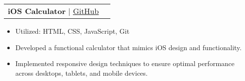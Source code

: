 \documentclass[letterpaper,11pt]{article}
\makeatletter
\newcommand{\resumeItem}[1]{
  \item\small{
    {#1 \vspace{-3pt}}
  }
}
\newcommand{\resumeProjectHeading}[2]{
    \item
    \begin{tabular*}{0.97\textwidth}{l@{\extracolsep{\fill}}r@{\hspace{-0.2in}}}
        \small#1 & #2 \\
    \end{tabular*}\vspace{-7pt}
}
\newcommand{\resumeItemListStart}{\begin{itemize}[leftmargin=0.15in, rightmargin=0.15in]}
\newcommand{\resumeItemListEnd}{\end{itemize}\vspace{-7pt}}
\makeatother
\begin{document}

        
        
        \resumeProjectHeading
            {\textbf{iOS Calculator} $|$ \href{https://github.com/juhun32/ios-calculator}{\underline{GitHub}}}{}
            \resumeItemListStart
                \resumeItem{Utilized: HTML, CSS, JavaScript, Git}
                \resumeItem{Developed a functional calculator that mimics iOS design and functionality.}
                \resumeItem{Implemented responsive design techniques to ensure optimal performance across desktops, tablets, and mobile devices.}
            \resumeItemListEnd
            
\end{document}
